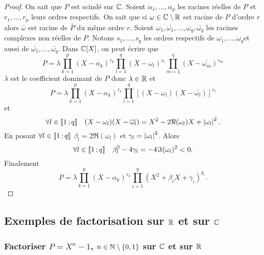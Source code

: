 \begin{proof}
  On sait que \(P\) est scindé sur \(\mathbb{C}\). Soient \(\alpha_1, \ldots, \alpha_p\) 
  les racines réelles de \(P\) et \(r_1, \ldots, r_p\) leurs ordres respectifs. 
  On sait que si \(\omega \in \mathbb{C}\setminus\mathbb{R}\) est racine de \(P\) d'ordre \(r\) 
  alors \(\bar{\omega}\) est racine de \(\bar{P}\) du même ordre \(r\).
  Soient \(\omega_1, \bar{\omega_1}, \ldots, \omega_q, \bar{\omega_q}\) les 
  racines complexes non réelles de \(P\). Notons \(s_1, \ldots, s_q\) les ordres 
  respectifs de \(\omega_1, \ldots, \omega_q\)et aussi de \(\bar{\omega_1}, 
  \ldots, \bar{\omega_q}\). Dans \(\mathbb{C}[X]\), on peut écrire que
  \begin{equation}
    P=\lambda \prod_{k=1}^p (X-\alpha_k)^{r_k} \prod_{l=1}^q (X-\omega_l)^{s_l} 
    \prod_{m=1}^q (X-\bar{\omega_m})^{s_m}
  \end{equation}
  \(\lambda\) est le coefficient dominant de \(P\) donc \(\lambda \in \mathbb{R}\) et
  \begin{equation}
    P = \lambda \prod_{k=1}^p (X-\alpha_k)^{r_k} \prod_{l=1}^q 
    [(X-\omega_l)(X-\bar{\omega_l})]^{s_l}
  \end{equation}
  et \begin{equation}
    \forall l \in \mathopen{\llbracket}1\mathclose{}\mathpunct{};q\mathclose{\rrbracket} \quad (X-\omega_l)(X-\overline{\omega_l}) = 
    X^2 -2\Re(\omega_l)X + \left\lvert\omega_l\right\rvert^2.
  \end{equation}
  En posant \(\forall l \in \mathopen{\llbracket}1\mathclose{}\mathpunct{};q\mathclose{\rrbracket}\) \(\beta_l = 
  2\Re(\omega_l)\) et \(\gamma_l = \left\lvert\omega_l\right\rvert^2\). Alors
  \begin{equation}
    \forall l \in \mathopen{\llbracket}1\mathclose{}\mathpunct{};q\mathclose{\rrbracket} \quad \beta_l^2 -4\gamma_l = 
    -4\Im(\omega_l)^2 < 0.
  \end{equation}
  Finalement
  \begin{equation}
    P = \lambda \prod_{k=1}^p (X-\alpha_k)^{r_k} \prod_{i=1}^q(X^2+\beta_i 
    X+\gamma_i)^{\delta_i}.
  \end{equation}
\end{proof}

\subsection{Exemples de factorisation sur \(\mathbb{R}\) et sur \(\mathbb{C}\)}

\subsubsection{Factoriser \(P=X^n-1\), \(n \in \mathbb{N}\setminus\{0,1\}\) sur \(\mathbb{C}\) 
et sur \(\mathbb{R}\)}

